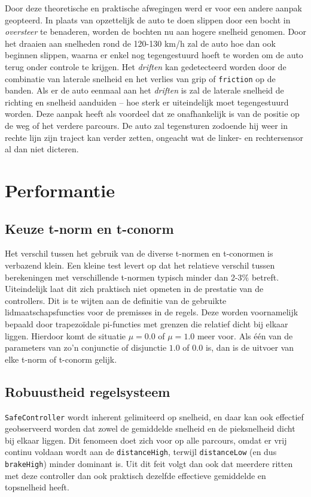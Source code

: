 \documentclass[10pt,a4paper]{article}
\begin{document}
			Door deze theoretische en praktische afwegingen werd er voor een andere aanpak geopteerd. In plaats van opzettelijk de auto te doen slippen door een bocht in \textit{oversteer} te benaderen, worden de bochten nu aan hogere snelheid genomen. Door het draaien aan snelheden rond de 120-130 km/h zal de auto hoe dan ook beginnen slippen, waarna er enkel nog tegengestuurd hoeft te worden om de auto terug onder controle te krijgen. Het \textit{driften} kan gedetecteerd worden door de combinatie van laterale snelheid en het verlies van grip of \texttt{friction} op de banden. Als er de auto eenmaal aan het \textit{driften} is zal de laterale snelheid de richting en snelheid aanduiden -- hoe sterk er uiteindelijk moet tegengestuurd worden. Deze aanpak heeft als voordeel dat ze onafhankelijk is van de positie op de weg of het verdere parcours. De auto zal tegensturen zodoende hij weer in rechte lijn zijn traject kan verder zetten, ongeacht wat de linker- en rechtersensor al dan niet dicteren.\\

	\section{Performantie}
		\subsection{Keuze t-norm en t-conorm}
			Het verschil tussen het gebruik van de diverse t-normen en t-conormen is verbazend klein. Een kleine test levert op dat het relatieve verschil tussen berekeningen met verschillende t-normen typisch minder dan 2-3\% betreft. Uiteindelijk laat dit zich praktisch niet opmeten in de prestatie van de controllers. Dit is te wijten aan de definitie van de gebruikte lidmaatschapsfuncties voor de premisses in de regels. Deze worden voornamelijk bepaald door trapezo\"idale pi-functies met grenzen die relatief dicht bij elkaar liggen. Hierdoor komt de situatie $\mu = 0.0$ of $\mu = 1.0$ meer voor. Als \'e\'en van de parameters van zo'n conjunctie of disjunctie $1.0$ of $0.0$ is, dan is de uitvoer van elke t-norm of t-conorm gelijk.\\

		\subsection{Robuustheid regelsysteem}
			\texttt{SafeController} wordt inherent gelimiteerd op snelheid, en daar kan ook effectief geobserveerd worden dat zowel de gemiddelde snelheid en de pieksnelheid dicht bij elkaar liggen. Dit fenomeen doet zich voor op alle parcours, omdat er vrij continu voldaan wordt aan de \texttt{distanceHigh}, terwijl \texttt{distanceLow} (en dus \texttt{brakeHigh}) minder dominant is. Uit dit feit volgt dan ook dat meerdere ritten met deze controller dan ook praktisch dezelfde effectieve gemiddelde en topsnelheid heeft.\\
\end{document}
